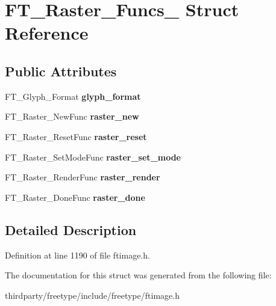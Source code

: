 \hypertarget{struct_f_t___raster___funcs__}{}\section{F\+T\+\_\+\+Raster\+\_\+\+Funcs\+\_\+ Struct Reference}
\label{struct_f_t___raster___funcs__}
\subsection*{Public Attributes}
\begin{DoxyCompactItemize}
\item 
\mbox{\label{struct_f_t___raster___funcs___a741b43afa16f1f1b7f633cebd9f1d6a9}} 
F\+T\+\_\+\+Glyph\+\_\+\+Format {\bfseries glyph\+\_\+format}
\item 
\mbox{\label{struct_f_t___raster___funcs___a31c9df9af6636df8a17a11bcd921b6a4}} 
F\+T\+\_\+\+Raster\+\_\+\+New\+Func {\bfseries raster\+\_\+new}
\item 
\mbox{\label{struct_f_t___raster___funcs___a91e9decd6066090a5f306f33f9815d39}} 
F\+T\+\_\+\+Raster\+\_\+\+Reset\+Func {\bfseries raster\+\_\+reset}
\item 
\mbox{\label{struct_f_t___raster___funcs___a3b37c781e54cf933cb60f57f2d45b32c}} 
F\+T\+\_\+\+Raster\+\_\+\+Set\+Mode\+Func {\bfseries raster\+\_\+set\+\_\+mode}
\item 
\mbox{\label{struct_f_t___raster___funcs___a7479a3def4522ce2667d6772e7bb96a5}} 
F\+T\+\_\+\+Raster\+\_\+\+Render\+Func {\bfseries raster\+\_\+render}
\item 
\mbox{\label{struct_f_t___raster___funcs___aecfd50bb6567d4442c997467cd68c857}} 
F\+T\+\_\+\+Raster\+\_\+\+Done\+Func {\bfseries raster\+\_\+done}
\end{DoxyCompactItemize}


\subsection{Detailed Description}


Definition at line 1190 of file ftimage.\+h.



The documentation for this struct was generated from the following file\+:\begin{DoxyCompactItemize}
\item 
thirdparty/freetype/include/freetype/ftimage.\+h\end{DoxyCompactItemize}
